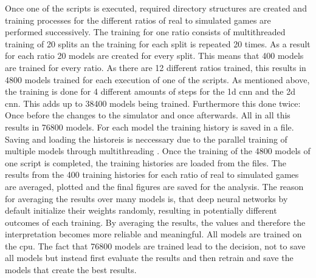 Once one of the scripts is executed, required directory structures are created and training processes for the different ratios of real to simulated games are performed successively. The training for one ratio consists of multithreaded  training of 20 splits an the training for each split is repeated 20 times. As a result for each ratio 20 models are created for every split. This means that 400 models are trained for every ratio. As there are 12 different ratios trained, this results in 4800 models trained for each execution of one of the scripts. As mentioned above, the training is done for 4 different amounts of steps for the 1d cnn and the 2d cnn. This adds up to 38400 models being trained. Furthermore this done twice: Once before the changes to the simulator and once afterwards. All in all this results in 76800 models. For each model the training history is saved in a file. Saving and loading the historeis is neccessary due to the parallel training of multiple models through multithreading .  Once the training of the 4800 models of one script is completed, the training histories are loaded from the files. The results from the 400 training histories for each ratio of real to simulated games are averaged, plotted and the final figures are saved for the analysis. The reason for averaging the results over many models is, that deep neural networks by default initialize their weights randomly, resulting in potentially different outcomes of each training. By averaging the results, the values and therefore the interpretation becomes more reliable and meaningful. All models are trained on the cpu. The fact that 76800 models are trained lead to the decision, not to save all models but instead first evaluate the results and then retrain and save the models that create the best results. 

